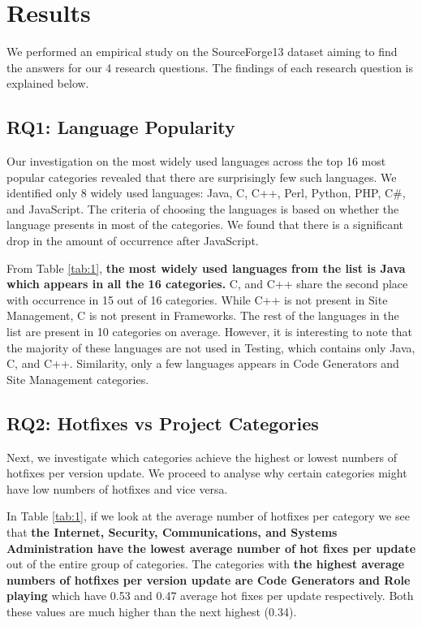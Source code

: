 \documentclass{sig-alternate}
\begin{document}
\section{Results}
We performed an empirical study on the SourceForge13 dataset aiming to find the answers for our 4 research questions. The findings of each research question is explained below.
\subsection{RQ1: Language Popularity}
Our investigation on the most widely used languages across the top 16 most popular categories revealed that there are surprisingly few such languages. We identified only 8 widely used languages: Java, C, C++, Perl, Python, PHP, C\#, and JavaScript. The criteria of choosing the languages is based on whether the language presents in most of the categories. We found that there is a significant drop in the amount of occurrence after JavaScript.  %

From Table \ref{tab:1}, \textbf{the most widely used languages from the list is Java which appears in all the 16 categories.} C, and C++ share the second place with occurrence in 15 out of 16 categories. While C++ is not present in Site Management, C is not present in Frameworks. The rest of the languages in the list are present in 10 categories on average. However, it is interesting to note that the majority of these languages are not used in Testing, which contains only Java, C, and C++. Similarity, only a few languages appears in Code Generators and Site Management categories.

\subsection{RQ2: Hotfixes vs Project Categories}
Next, we investigate which categories achieve the highest or lowest numbers of hotfixes per version update. We proceed to analyse why certain categories might have low numbers of hotfixes and vice versa.
    
In Table \ref{tab:1}, if we look at the average number of hotfixes per category we see that \textbf{the Internet, Security, Communications, and Systems Administration have the lowest average number of hot fixes per update} out of the entire group of categories. The categories with \textbf{the highest average numbers of hotfixes per version update are Code Generators and Role playing} which have 0.53 and 0.47 average hot fixes per update respectively. Both these values are much higher than the next highest (0.34).
\end{document}
